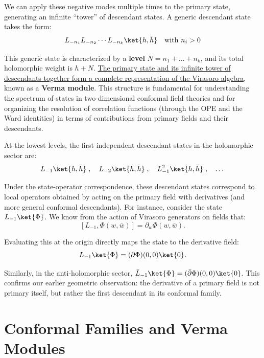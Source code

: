 We can apply these negative modes multiple times to the primary state, generating an infinite ``tower'' of descendant states. A generic descendant state takes the form:
\[
    L_{-n_1} L_{-n_2} \cdots L_{-n_k} \ket{h, \bar{h}} \quad \text{with } n_i > 0
\]

This generic state is characterized by a \textbf{level} \(N = n_1 + \dots + n_k\), and its total holomorphic weight is \(h + N\). \uline{The primary state and its infinite tower of descendants together form a complete representation of the Virasoro algebra}, known as a \textbf{Verma module}. This structure is fundamental for understanding the spectrum of states in two-dimensional conformal field theories and for organizing the resolution of correlation functions (through the OPE and the Ward identities) in terms of contributions from primary fields and their descendants.

\begin{example}
    At the lowest levels, the first independent descendant states in the holomorphic sector are:
    \[
        L_{-1}\ket{h, \bar{h}} \;, \quad L_{-2}\ket{h, \bar{h}} \;, \quad L_{-1}^2\ket{h, \bar{h}} \;, \quad \dots
    \]

    Under the state-operator correspondence, these descendant states correspond to local operators obtained by acting on the primary field with derivatives (and more general conformal descendants). For instance, consider the state \(L_{-1}\ket{\Phi}\). We know from the action of Virasoro generators on fields that:
    \[
        [L_{-1}, \Phi(w, \bar{w})] = \partial_w \Phi(w, \bar{w}).
    \]

    Evaluating this at the origin directly maps the state to the derivative field:
    \[
        L_{-1}\ket{\Phi} = (\partial\Phi)(0,0)\ket{0}.
    \]

    Similarly, in the anti-holomorphic sector, \(\bar{L}_{-1}\ket{\Phi} = (\bar{\partial}\Phi)(0,0)\ket{0}\). This confirms our earlier geometric observation: the derivative of a primary field is not primary itself, but rather the first descendant in its conformal family.
\end{example}

\section{Conformal Families and Verma Modules}

